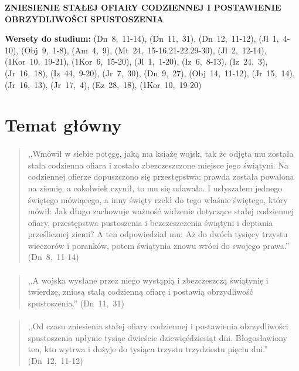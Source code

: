 \documentclass[10pt,a4paper,oneside]{article}
\begin{document}
\centerline{\textbf{\MakeUppercase{Zniesienie stałej ofiary codziennej i postawienie obrzydliwości spustoszenia}}}
\begin{center}
\textbf{Wersety do studium:} 
\mbox{(Dn 8, 11-14)}, \mbox{(Dn 11, 31)}, \mbox{(Dn 12, 11-12)}, \mbox{(Jl 1, 4-10)}, \mbox{(Obj 9, 1-8)}, \mbox{(Am 4, 9)}, \mbox{(Mt 24, 15-16.21-22.29-30)}, \mbox{(Jl 2, 12-14)}, \mbox{(1Kor 10, 19-21)}, \mbox{(1Kor 6, 15-20)}, \mbox{(Jl 1, 1-20)}, \mbox{(Iz 6, 8-13)}, \mbox{(Iz 24, 3)}, \mbox{(Jr 16, 18)}, \mbox{(Iz 44, 9-20)}, \mbox{(Jr 7, 30)}, \mbox{(Dn 9, 27)}, \mbox{(Obj 14, 11-12)}, \mbox{(Jr 15, 14)}, \mbox{(Jr 16, 13)}, \mbox{(Jr 17, 4)}, \mbox{(Ez 28, 18)}, \mbox{(1Kor 10, 19-20)}
\end{center}
\section{Temat główny}
\paragraph{}
\begin{quote}
,,Wmówił w siebie potęgę, jaką ma książę wojsk, tak że odjęta mu została stała codzienna ofiara i zostało zbezczeszczone miejsce jego świątyni. Na codziennej ofierze dopuszczono się przestępstwa; prawda została powalona na ziemię, a cokolwiek czynił, to mu się udawało. I usłyszałem jednego świętego mówiącego, a inny święty rzekł do tego właśnie świętego, który mówił: Jak długo zachowuje ważność widzenie dotyczące stałej codziennej ofiary, przestępstwa pustoszenia i bezczeszczenia świątyni i deptania prześlicznej ziemi? A ten odpowiedział mu: Aż do dwóch tysięcy trzystu wieczorów i poranków, potem świątynia znowu wróci do swojego prawa.'' \mbox{(Dn 8, 11-14)}
\end{quote}
\paragraph{}
\begin{quote}
,,A wojska wysłane przez niego wystąpią i zbezczeszczą świątynię i twierdzę, zniosą stałą codzienną ofiarę i postawią obrzydliwość spustoszenia.'' \mbox{(Dn 11, 31)}
\end{quote}
\paragraph{}
\begin{quote}
,,Od czasu zniesienia stałej ofiary codziennej i postawienia obrzydliwości spustoszenia upłynie tysiąc dwieście dziewięćdziesiąt dni. Błogosławiony ten, kto wytrwa i dożyje do tysiąca trzystu trzydziestu pięciu dni.'' \mbox{(Dn 12, 11-12)}
\end{quote}
\end{document}
